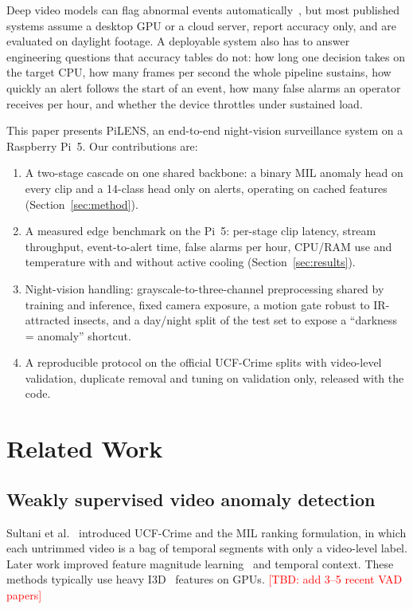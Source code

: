 \documentclass[journal]{IEEEtran}
\newcommand{\TBD}[1]{\textcolor{red}{[TBD: #1]}}
\begin{document}
Deep video models can flag abnormal events automatically~\cite{sultani2018}, but most published
systems assume a desktop GPU or a cloud server, report accuracy only, and are evaluated on
daylight footage. A deployable system also has to answer engineering questions that accuracy
tables do not: how long one decision takes on the target CPU, how many frames per second the
whole pipeline sustains, how quickly an alert follows the start of an event, how many false
alarms an operator receives per hour, and whether the device throttles under sustained load.

This paper presents PiLENS, an end-to-end night-vision surveillance system on a Raspberry Pi~5.
Our contributions are:
\begin{enumerate}
\item A two-stage cascade on one shared backbone: a binary MIL anomaly head on every clip and a
14-class head only on alerts, operating on cached features (Section~\ref{sec:method}).
\item A measured edge benchmark on the Pi~5: per-stage clip latency, stream throughput,
event-to-alert time, false alarms per hour, CPU/RAM use and temperature with and without active
cooling (Section~\ref{sec:results}).
\item Night-vision handling: grayscale-to-three-channel preprocessing shared by training and
inference, fixed camera exposure, a motion gate robust to IR-attracted insects, and a day/night
split of the test set to expose a ``darkness = anomaly'' shortcut.
\item A reproducible protocol on the official UCF-Crime splits with video-level validation,
duplicate removal and tuning on validation only, released with the code.
\end{enumerate}

\section{Related Work}
\subsection{Weakly supervised video anomaly detection}
Sultani et al.~\cite{sultani2018} introduced UCF-Crime and the MIL ranking formulation, in which
each untrimmed video is a bag of temporal segments with only a video-level label. Later work
improved feature magnitude learning~\cite{tian2021rtfm} and temporal context. These methods
typically use heavy I3D~\cite{carreira2017} features on GPUs. \TBD{add 3--5 recent VAD papers}
\end{document}

